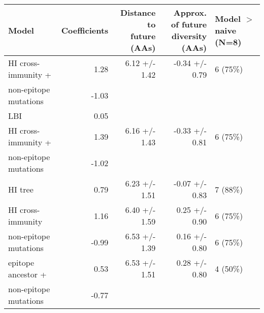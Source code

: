 \begin{tabular*}{1.0\textwidth}{lrrrl}
\toprule
                             Model & Coefficients & \makecell{Distance to \\ future (AAs)} & \makecell{Approx. of future \\ diversity (AAs)} & \makecell[l]{Model $>$ naive \\ (N=8)} \\
\midrule
               HI cross-immunity + &         1.28 &                          6.12 +/- 1.42 &                                  -0.34 +/- 0.79 &                               6 (75\%) \\
 \hspace{3mm}non-epitope mutations &        -1.03 &                                        &                                                 &                                        \\
                   \hspace{3mm}LBI &         0.05 &                                        &                                                 &                                        \\
               HI cross-immunity + &         1.39 &                          6.16 +/- 1.43 &                                  -0.33 +/- 0.81 &                               6 (75\%) \\
 \hspace{3mm}non-epitope mutations &        -1.02 &                                        &                                                 &                                        \\
                           HI tree &         0.79 &                          6.23 +/- 1.51 &                                  -0.07 +/- 0.83 &                               7 (88\%) \\
                 HI cross-immunity &         1.16 &                          6.40 +/- 1.59 &                                   0.25 +/- 0.90 &                               6 (75\%) \\
             non-epitope mutations &        -0.99 &                          6.53 +/- 1.39 &                                   0.16 +/- 0.80 &                               6 (75\%) \\
                epitope ancestor + &         0.53 &                          6.53 +/- 1.51 &                                   0.28 +/- 0.80 &                               4 (50\%) \\
 \hspace{3mm}non-epitope mutations &        -0.77 &                                        &                                                 &                                        \\

\end{tabular*}

